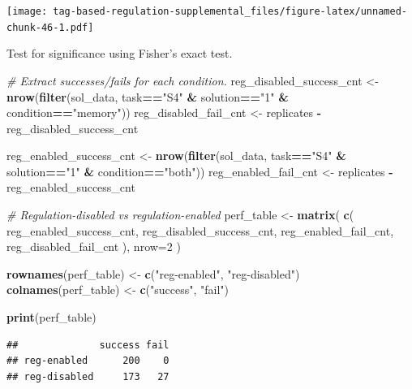 \documentclass[]{book}
\newenvironment{Shaded}{\begin{snugshade}}{\end{snugshade}}
\newcommand{\CommentTok}[1]{\textcolor[rgb]{0.56,0.35,0.01}{\textit{#1}}}
\newcommand{\DataTypeTok}[1]{\textcolor[rgb]{0.13,0.29,0.53}{#1}}
\newcommand{\DecValTok}[1]{\textcolor[rgb]{0.00,0.00,0.81}{#1}}
\newcommand{\KeywordTok}[1]{\textcolor[rgb]{0.13,0.29,0.53}{\textbf{#1}}}
\newcommand{\NormalTok}[1]{#1}
\newcommand{\OperatorTok}[1]{\textcolor[rgb]{0.81,0.36,0.00}{\textbf{#1}}}
\newcommand{\StringTok}[1]{\textcolor[rgb]{0.31,0.60,0.02}{#1}}
\begin{document}
\texttt{[image: tag-based-regulation-supplemental\_files/figure-latex/unnamed-chunk-46-1.pdf]}

Test for significance using Fisher's exact test.

\begin{Shaded}
\begin{Highlighting}[]
\CommentTok{# Extract successes/fails for each condition.}
\NormalTok{reg_disabled_success_cnt <-}\StringTok{ }\KeywordTok{nrow}\NormalTok{(}\KeywordTok{filter}\NormalTok{(sol_data, task}\OperatorTok{==}\StringTok{"S4"} \OperatorTok{&}\StringTok{ }\NormalTok{solution}\OperatorTok{==}\StringTok{"1"} \OperatorTok{&}\StringTok{ }\NormalTok{condition}\OperatorTok{==}\StringTok{"memory"}\NormalTok{))}
\NormalTok{reg_disabled_fail_cnt <-}\StringTok{ }\NormalTok{replicates }\OperatorTok{-}\StringTok{ }\NormalTok{reg_disabled_success_cnt}

\NormalTok{reg_enabled_success_cnt <-}\StringTok{ }\KeywordTok{nrow}\NormalTok{(}\KeywordTok{filter}\NormalTok{(sol_data, task}\OperatorTok{==}\StringTok{"S4"} \OperatorTok{&}\StringTok{ }\NormalTok{solution}\OperatorTok{==}\StringTok{"1"} \OperatorTok{&}\StringTok{ }\NormalTok{condition}\OperatorTok{==}\StringTok{"both"}\NormalTok{))}
\NormalTok{reg_enabled_fail_cnt <-}\StringTok{ }\NormalTok{replicates }\OperatorTok{-}\StringTok{ }\NormalTok{reg_enabled_success_cnt}

\CommentTok{# Regulation-disabled vs regulation-enabled}
\NormalTok{perf_table <-}\StringTok{ }\KeywordTok{matrix}\NormalTok{(}
  \KeywordTok{c}\NormalTok{(}
\NormalTok{    reg_enabled_success_cnt,}
\NormalTok{    reg_disabled_success_cnt,}
\NormalTok{    reg_enabled_fail_cnt,}
\NormalTok{    reg_disabled_fail_cnt}
\NormalTok{    ),}
    \DataTypeTok{nrow=}\DecValTok{2}
\NormalTok{)}

\KeywordTok{rownames}\NormalTok{(perf_table) <-}\StringTok{ }\KeywordTok{c}\NormalTok{(}\StringTok{"reg-enabled"}\NormalTok{, }\StringTok{"reg-disabled"}\NormalTok{)}
\KeywordTok{colnames}\NormalTok{(perf_table) <-}\StringTok{ }\KeywordTok{c}\NormalTok{(}\StringTok{"success"}\NormalTok{, }\StringTok{"fail"}\NormalTok{)}

\KeywordTok{print}\NormalTok{(perf_table)}
\end{Highlighting}
\end{Shaded}

\begin{verbatim}
##              success fail
## reg-enabled      200    0
## reg-disabled     173   27
\end{verbatim}
\end{document}

